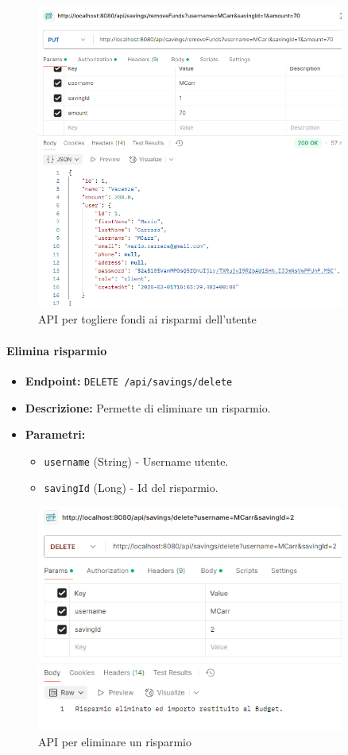 \begin{figure}[H]
    \centering
    \includegraphics[width=0.9\textwidth]{images/RemoveFundsSavingAPI.png}
    \caption{API per togliere fondi ai risparmi dell'utente}
    \label{fig:RemoveFundsSavingAPI}
\end{figure}

\paragraph{Elimina risparmio}

\begin{itemize}
    \item \textbf{Endpoint:} \texttt{DELETE /api/savings/delete}
    \item \textbf{Descrizione:} Permette di eliminare un risparmio.
    \item \textbf{Parametri:}
    \begin{itemize}
        \item \texttt{username} (String) - Username utente.
        \item \texttt{savingId} (Long) - Id del risparmio.
    \end{itemize}
\end{itemize}

\begin{figure}[H]
    \centering
    \includegraphics[width=0.9\textwidth]{images/DeleteSavingAPI.png}
    \caption{API per eliminare un risparmio}
    \label{fig:DeleteSavingAPI}
\end{figure}